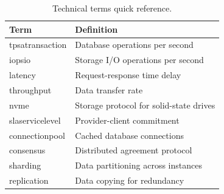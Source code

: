 \documentclass[
    language=english,
    doctype=technical-report,
    institution=none,
    titlestyle=book,
    oneside,
    loadGlossaries,
]{../../omnilatex}
\begin{document}
\begin{table}[htbp]
    \centering
    \caption{Technical terms quick reference.}
    \label{tab:glossary-summary}
    \begin{tabular}{@{}lp{}@{}}
        \toprule
        \textbf{Term} & \textbf{Definition} \\
        \midrule
        \gls{tpsatransaction} & Database operations per second \\
        \gls{iopsio} & Storage I/O operations per second \\
        \gls{latency} & Request-response time delay \\
        \gls{throughput} & Data transfer rate \\
        \gls{nvme} & Storage protocol for solid-state drives \\
        \gls{slaservicelevel} & Provider-client commitment \\
        \gls{connectionpool} & Cached database connections \\
        \gls{consensus} & Distributed agreement protocol \\
        \gls{sharding} & Data partitioning across instances \\
        \gls{replication} & Data copying for redundancy \\
        \bottomrule
    \end{tabular}
\end{table}
\end{document}
